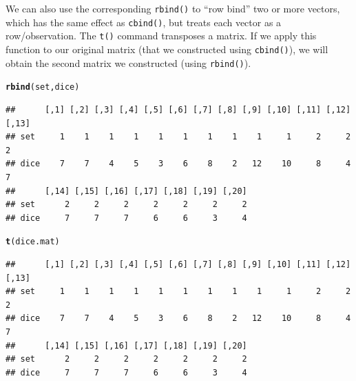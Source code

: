 \documentclass[12pt]{article}\usepackage[]{graphicx}\usepackage[]{color}
\makeatletter
\newcommand{\hlstd}[1]{\textcolor[rgb]{0.345,0.345,0.345}{#1}}%
\newcommand{\hlkwd}[1]{\textcolor[rgb]{0.737,0.353,0.396}{\textbf{#1}}}%
\newenvironment{kframe}{%
 \def\at@end@of@kframe{}%
 \ifinner\ifhmode%
  \def\at@end@of@kframe{\end{minipage}}%
  \begin{minipage}{\columnwidth}%
 \fi\fi%
 \def\FrameCommand##1{\hskip\@totalleftmargin \hskip-\fboxsep
 \colorbox{shadecolor}{##1}\hskip-\fboxsep
     \hskip-\linewidth \hskip-\@totalleftmargin \hskip\columnwidth}%
 \MakeFramed {\advance\hsize-\width
   \@totalleftmargin\z@ \linewidth\hsize
   \@setminipage}}%
 {\par\unskip\endMakeFramed%
 \at@end@of@kframe}
\newenvironment{knitrout}{}{} %
\makeatother
\begin{document}
We can also use the corresponding \texttt{rbind()} to ``row bind'' two or more vectors, which has the same effect as \texttt{cbind()}, but treats each vector as a row/observation. The \texttt{t()} command transposes a matrix. If we apply this function to our original matrix (that we constructed using \texttt{cbind()}), we will obtain the second matrix we constructed (using \texttt{rbind()}).
\begin{knitrout}
\color{fgcolor}\begin{kframe}
\begin{alltt}
\hlkwd{rbind}\hlstd{(set,dice)}
\end{alltt}
\begin{verbatim}
##      [,1] [,2] [,3] [,4] [,5] [,6] [,7] [,8] [,9] [,10] [,11] [,12] [,13]
## set     1    1    1    1    1    1    1    1    1     1     2     2     2
## dice    7    7    4    5    3    6    8    2   12    10     8     4     7
##      [,14] [,15] [,16] [,17] [,18] [,19] [,20]
## set      2     2     2     2     2     2     2
## dice     7     7     7     6     6     3     4
\end{verbatim}
\begin{alltt}
\hlkwd{t}\hlstd{(dice.mat)}
\end{alltt}
\begin{verbatim}
##      [,1] [,2] [,3] [,4] [,5] [,6] [,7] [,8] [,9] [,10] [,11] [,12] [,13]
## set     1    1    1    1    1    1    1    1    1     1     2     2     2
## dice    7    7    4    5    3    6    8    2   12    10     8     4     7
##      [,14] [,15] [,16] [,17] [,18] [,19] [,20]
## set      2     2     2     2     2     2     2
## dice     7     7     7     6     6     3     4
\end{verbatim}
\end{kframe}
\end{knitrout}
\end{document}
